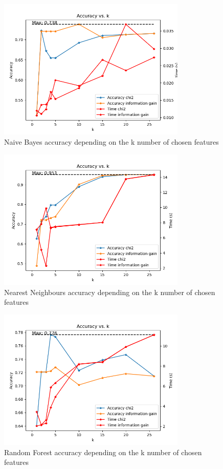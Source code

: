 \documentclass{article}
\begin{document}
    \begin{figure}[H]
        \centering
        \includegraphics[width=0.8\textwidth]{report_img/k_search/naive_bayes}
        \caption{Naive Bayes accuracy depending on the k number of chosen features}
        \label{fig:}
    \end{figure}

    \begin{figure}[H]
        \centering
        \includegraphics[width=0.8\textwidth]{report_img/k_search/nearest_neighbors}
        \caption{Nearest Neighbours accuracy depending on the k number of chosen features}
        \label{fig:}
    \end{figure}

    \begin{figure}[H]
        \centering
        \includegraphics[width=0.8\textwidth]{report_img/k_search/random_forest}
        \caption{Random Forest accuracy depending on the k number of chosen features}
        \label{fig:}
    \end{figure}
\end{document}
